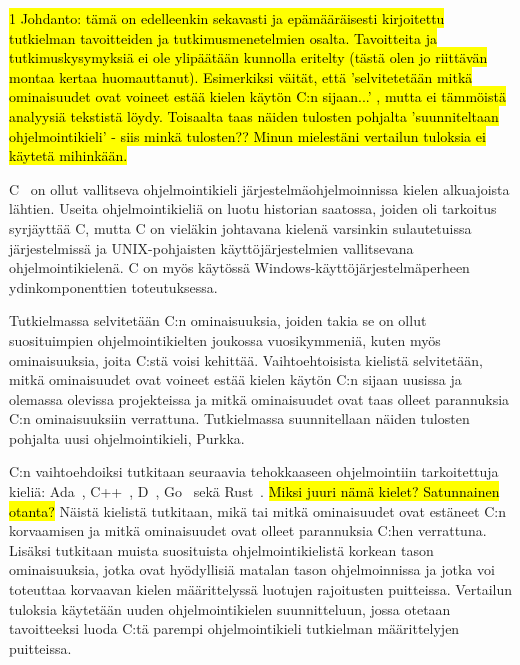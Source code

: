 \grayrule

\hl{ 1 Johdanto: tämä on edelleenkin sekavasti ja epämääräisesti kirjoitettu
tutkielman tavoitteiden ja tutkimusmenetelmien osalta. Tavoitteita ja
tutkimuskysymyksiä ei ole ylipäätään kunnolla eritelty (tästä olen jo riittävän
montaa kertaa huomauttanut). Esimerkiksi väität, että 'selvitetetään mitkä
ominaisuudet ovat voineet estää kielen käytön C:n sijaan...'  , mutta ei
tämmöistä analyysiä tekstistä löydy. Toisaalta taas näiden tulosten pohjalta
'suunniteltaan ohjelmointikieli' - siis minkä tulosten?? Minun mielestäni
vertailun tuloksia ei käytetä mihinkään. } 

C~\citep{C18} on ollut vallitseva ohjelmointikieli järjestelmäohjelmoinnissa
kielen alkuajoista lähtien. Useita ohjelmointikieliä on luotu historian
saatossa, joiden oli tarkoitus syrjäyttää C, mutta C on vieläkin johtavana
kielenä varsinkin sulautetuissa järjestelmissä ja UNIX-pohjaisten
käyttöjärjestelmien vallitsevana ohjelmointikielenä. C on myös käytössä
Windows-käyttöjärjestelmäperheen ydinkomponenttien toteutuksessa.

Tutkielmassa selvitetään C:n ominaisuuksia, joiden takia se on ollut
suosituimpien ohjelmointikielten joukossa vuosikymmeniä, kuten myös
ominaisuuksia, joita C:stä voisi kehittää. Vaihtoehtoisista kielistä
selvitetään, mitkä ominaisuudet ovat voineet estää kielen käytön C:n sijaan
uusissa ja olemassa olevissa projekteissa ja mitkä ominaisuudet ovat taas
olleet parannuksia C:n ominaisuuksiin verrattuna. Tutkielmassa suunnitellaan
näiden tulosten pohjalta uusi ohjelmointikieli, Purkka.

C:n vaihtoehdoiksi tutkitaan seuraavia tehokkaaseen ohjelmointiin tarkoitettuja
kieliä: Ada~\citep{ADA12}, C++~\citep{CPP17}, D~\citep{D}, Go~\citep{golang}
sekä Rust~\citep{rust}. \hl{Miksi juuri nämä kielet? Satunnainen otanta?}
Näistä kielistä tutkitaan, mikä tai mitkä ominaisuudet ovat estäneet C:n
korvaamisen ja mitkä ominaisuudet ovat olleet parannuksia C:hen verrattuna.
Lisäksi tutkitaan muista suosituista ohjelmointikielistä korkean tason
ominaisuuksia, jotka ovat hyödyllisiä matalan tason ohjelmoinnissa ja jotka voi
toteuttaa korvaavan kielen määrittelyssä luotujen rajoitusten puitteissa.
Vertailun tuloksia käytetään uuden ohjelmointikielen suunnitteluun, jossa
otetaan tavoitteeksi luoda C:tä parempi ohjelmointikieli tutkielman
määrittelyjen puitteissa.

